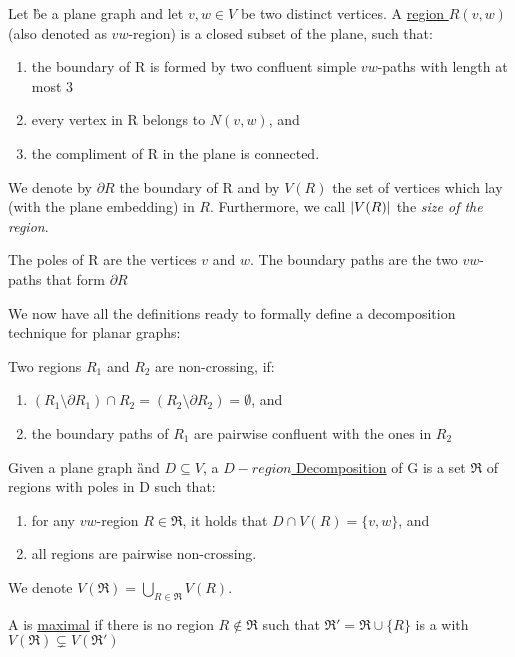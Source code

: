 
\begin{definition}
    Let \G be a plane graph and let $v,w \in V$ be two distinct vertices. A \underline{ region $R(v,w)$} (also denoted as $vw$-region) is a closed subset of the plane, such that:
    \begin{enumerate}
        \item the boundary of R is formed by two confluent simple $vw$-paths with length at most 3
        \item every vertex in R belongs to $N(v,w)$, and 
        \item the compliment of R in the plane is connected.
    \end{enumerate}

    We denote by $\partial R$ the boundary of R and by $V(R)$ the set of vertices which lay (with the plane embedding) in $R$. Furthermore, we call $\abs{V(R)}$ the \textit{size of the region}.

    The poles of R are the vertices $v$ and $w$. The boundary paths are the two $vw$-paths that form $\partial R$ 

\end{definition}


We now have all the definitions ready to formally define a decomposition technique for planar graphs:

\begin{definition}
    Two regions $R_1$ and $R_2$ are non-crossing, if:
    \begin{enumerate}
        \item $(R_1 \setminus \partial R_1) \cap R_2 = (R_2 \setminus \partial R_2) = \emptyset$, and 
        \item the boundary paths of $R_1$ are pairwise confluent with the ones in $R_2$
    \end{enumerate}
\end{definition}

\begin{definition}
    Given a plane graph \G and $D\subseteq V$, a \underline{$D-region$ Decomposition} of G is a set $\mathfrak{R}$ of regions with poles in D such that: 
    \begin{enumerate}
        \item for any $vw$-region $R \in \mathfrak{R} $, it holds that $D \cap V(R) = \{v, w\}$, and
        \item all regions are pairwise non-crossing. 
    \end{enumerate}
    We denote $V(\mathfrak{R}) = \bigcup\limits_{R \in \mathfrak{R}} V(R)$. 
    
    \noindent A \dreg is \underline{maximal} if there is no region $R \notin \mathfrak{R}$ such that $\mathfrak{R}' = \mathfrak{R} \cup \{R\}$ is a \dreg with $V(\mathfrak{R}) \subsetneq V(\mathfrak{R}')$
\end{definition}


